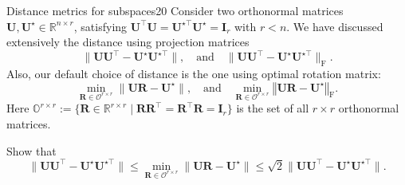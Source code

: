 \documentclass{article}
\begin{document}
\begin{problem}{Distance metrics for subspaces}{20}
Consider two orthonormal matrices $\bm{U},\bm{U}^{\star} \in\mathbb{R}^{n\times r}$,
	satisfying $\bm{U}^{\top}\bm{U}= \bm{U}^{\star\top} \bm{U}^{\star}=\bm{I}_r$ with $r<n$. We have discussed extensively the distance using projection matrices
\[
\|\bm{U}\bm{U}^{\top} - \bm{U}^{\star}\bm{U}^{\star\top} \|, \quad \text{and}\quad \|\bm{U}\bm{U}^{\top} - \bm{U}^{\star}\bm{U}^{\star\top} \|_{\mathrm{F}}.
\]
Also, our default choice of distance is the one using optimal rotation matrix: 
\[
\min_{\bm{R}\in \mathcal{O}^{r\times r}}\big\|\bm{U}\bm{R}-\bm{U}^{\star}\big\| , \quad \text{and}\quad \min_{\bm{R}\in\mathcal{O}^{r\times r}}\left\Vert \bm{U}\bm{R}-\bm{U}^{\star}\right\Vert _{\mathrm{F}}.
\]
Here $\mathbb{O}^{r\times r}:=\{\bm{R}\in\mathbb{R}^{r\times r}\mid\bm{R}\bm{R}^{\top}=\bm{R}^{\top}\bm{R}=\bm{I}_{r}\}$ is the set of all $r\times r$ orthonormal matrices. 


	 Show that 
	\[
	\|\bm{U}\bm{U}^{\top} - \bm{U}^{\star}\bm{U}^{\star\top} \|
	\leq
	\min_{\bm{R}\in \mathcal{O}^{r\times r}}\big\|\bm{U}\bm{R}-\bm{U}^{\star}\big\|
	\leq \sqrt{2} \|\bm{U}\bm{U}^{\top} - \bm{U}^{\star}\bm{U}^{\star\top} \|.
	\]


\end{problem}
\end{document}
